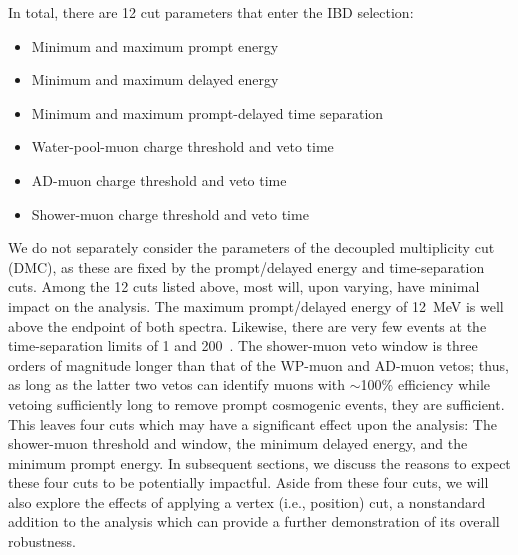 \documentclass[../thesis.tex]{subfiles}
\begin{document}
In total, there are 12 cut parameters that enter the IBD selection:

\begin{itemize}
\item Minimum and maximum prompt energy
\item Minimum and maximum delayed energy
\item Minimum and maximum prompt-delayed time separation
\item Water-pool-muon charge threshold and veto time
\item AD-muon charge threshold and veto time
\item Shower-muon charge threshold and veto time
\end{itemize}

We do not separately consider the parameters of the decoupled multiplicity cut (DMC), as these are fixed by the prompt/delayed energy and time-separation cuts. Among the 12 cuts listed above, most will, upon varying, have minimal impact on the analysis. The maximum prompt/delayed energy of 12~MeV is well above the endpoint of both spectra. Likewise, there are very few events at the time-separation limits of 1 and 200~\us. The shower-muon veto window is three orders of magnitude longer than that of the WP-muon and AD-muon vetos; thus, as long as the latter two vetos can identify muons with $\sim$100\% efficiency while vetoing sufficiently long to remove prompt cosmogenic events, they are sufficient. This leaves four cuts which may have a significant effect upon the analysis: The shower-muon threshold and window, the minimum delayed energy, and the minimum prompt energy. In subsequent sections, we discuss the reasons to expect these four cuts to be potentially impactful. Aside from these four cuts, we will also explore the effects of applying a vertex (i.e., position) cut, a nonstandard addition to the analysis which can provide a further demonstration of its overall robustness.
\end{document}
